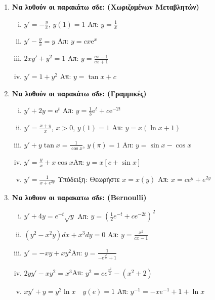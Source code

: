 \documentclass[a4paper,table]{report}
\begin{document}
\begin{center}
\end{center}

\vspace{\baselineskip}

\begin{enumerate}
  \item {\bfseries Να λυθούν οι παρακάτω σδε: (Χωριζομένων Μεταβλητών)}
    \begin{enumerate}[i)]
      \item $ y' = - \frac{y}{x} $, \quad $ y(1)=1 $ \hfill Απ: $ y = \frac{1}{x} $ 
      \item $ y'- \frac{y}{x} = y $ \hfill Απ: $ y=cx \mathrm{e}^{x} $ 
      \item $ 2xy'+y^{2} = 1 $ \hfill Απ: $ y= \frac{cx-1}{cx+1} $ 
      \item $ y'=1+y^{2} $ \hfill Απ: $ y= \tan{x+c} $ 
    \end{enumerate}

  \item {\bfseries Να λυθούν οι παρακάτω σδε: (Γραμμικές)}
    \begin{enumerate}[i)]
      \item $ y' +2y= \mathrm{e}^{t} $ \hfill Απ: $ y= \frac{1}{3} 
        \mathrm{e}^{t}+c \mathrm{e}^{-2t} $  
      \item $ y'= \frac{x+y}{x} $, \quad $x>0$, \; $ y(1)=1 $ 
        \hfill Απ: $ y=x(\ln{x} + 1) $  
      \item $ y'+y \tan{x} = \frac{1}{\cos{x}} $, \; $ y(\pi) = 1 $
        \hfill Απ: $ y= \sin{x} - \cos{x} $  
      \item $y'=\frac{y}{x}+x\cos x$\hfill Απ: $y=x[c+\sin x]$
      \item $y'=\frac{1}{x+e^{2y}}$ \quad\textcolor{Col1}{Υπόδειξη:} Θεωρήστε $x=x(y)$ 
        \hfill Απ: $x=ce^y+e^{2y}$
    \end{enumerate}

  \item {\bfseries Να λυθουν οι παρακατω σδε: (Bernoulli)}
    \begin{enumerate}[i)]
      \item $ y'+4y=e^{-t} \sqrt{y} $ 
        \hfill Απ: $ y=\left(\frac{1}{2} e^{-t}+ce^{-2t}\right)^{2} $  
      \item $ (y^{2}-x^{2}y)dx + x^{3} dy = 0 $ \hfill Απ: $ y = \frac{x^{2}}{cx-1} $ 
      \item $y'=-xy+xy^2$\hfill Απ: $y=\frac{1}{-e^{\frac{x^2}{2}}+1}$
      \item $2yy'-xy^2=x^3$\hfill Απ: $y^2=ce^{\frac{x^2}{2}}-(x^2+2)$
      \item $xy'+y=y^{2}\ln x \quad y(e)=1$ \hfill Απ: $y^{-1}=-xe^{-1}+1+\ln x$
    \end{enumerate}


\end{enumerate}
\end{document}
